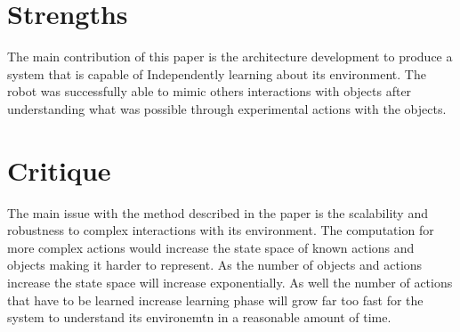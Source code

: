 \documentclass{article}
\begin{document}
\section*{Strengths}
The main contribution of this paper is the architecture development to produce a system that is capable of Independently learning about its environment. The robot was successfully able to mimic others interactions with objects after understanding what was possible through experimental actions with the objects.
\section*{Critique}
The main issue with the method described in the paper is the scalability and robustness to complex interactions with its environment. The computation for more complex actions would increase the state space of known actions and objects making it harder to represent. As the number of objects and actions increase the state space will increase exponentially. As well the number of actions that have to be learned increase learning phase will grow far too fast for the system to understand its environemtn in a reasonable amount of time.
\cite{4456755}
\end{document}
